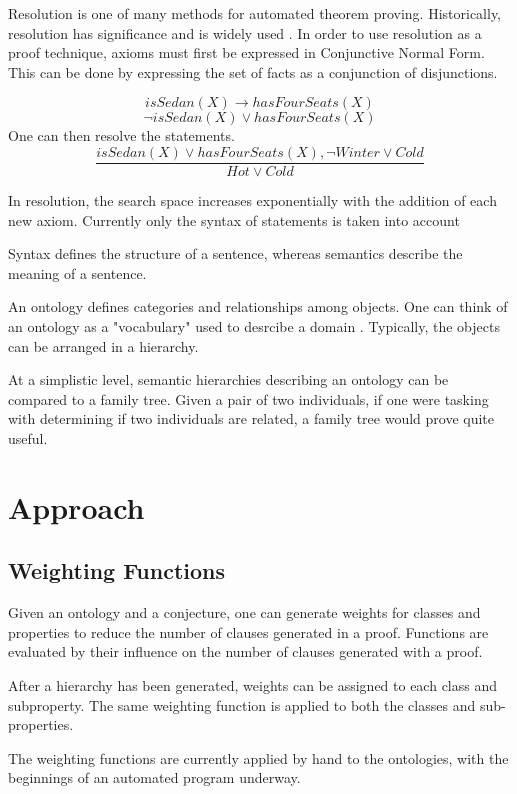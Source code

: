 \documentclass{article}
\begin{document}
Resolution is one of many methods for automated theorem proving. Historically, resolution has significance and is widely used \cite[51]{ertel2018introduction}.
In order to use resolution as a proof technique, axioms must first be expressed in Conjunctive Normal Form. This can be done by expressing the set of facts as a conjunction of disjunctions. 
\begin{singlespace}
		 \[isSedan(X) \rightarrow hasFourSeats(X)\]
		\[\lnot isSedan(X) \lor hasFourSeats(X)\]
		One can then resolve the statements. 
		\[\frac{isSedan(X) \lor hasFourSeats(X), \lnot Winter \lor Cold}{Hot \lor Cold}\]
\end{singlespace} 
		

In resolution, the search space increases exponentially with the addition of each new axiom. 
Currently only the syntax of statements is taken into account

	

        Syntax defines the structure of a sentence, whereas semantics describe the meaning of a sentence. 
	

		An ontology defines categories and relationships among objects.
		One can think of an ontology as a "vocabulary" used to desrcibe a domain \cite[308]{russell2016artificial}. Typically, the objects can be arranged in a hierarchy. 
		
	At a simplistic level, semantic hierarchies describing an ontology can be compared to a family tree. Given a pair of two individuals, if one were tasking with determining if two individuals are related, a family tree would prove quite useful. 


	\newpage	
	\section{Approach}
		\subsection{Weighting Functions}
Given an ontology and a conjecture, one can generate weights for classes and properties to reduce the number of clauses generated in a proof. Functions are evaluated by their influence on the number of clauses generated with a proof. 

After a hierarchy has been generated, weights can be assigned to each class and subproperty. The same weighting function is applied to both the classes and sub-properties. 

The weighting functions are currently applied by hand to the ontologies, with the beginnings of an automated program underway. 
\end{document}
